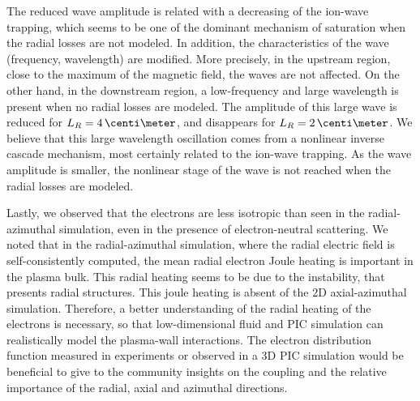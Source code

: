 The reduced wave amplitude is related with a decreasing of the ion-wave trapping, which seems to be one of the dominant mechanism of saturation when the radial losses are not modeled.
In addition, the characteristics of the wave (frequency, wavelength) are modified.
More precisely, in the upstream region, close to the maximum of the magnetic field, the waves are not affected.
On the other hand,  in the downstream region, a low-frequency and large wavelength is present when no radial losses are modeled.
The amplitude of this large wave is reduced for $L_R=4\,\centi\meter$, and disappears for $L_R=2\,\centi\meter$.
We believe that this large wavelength oscillation comes from a nonlinear inverse cascade mechanism, most certainly related to the ion-wave trapping.
As the wave amplitude is smaller, the nonlinear stage of the wave is not reached when the radial losses are modeled.


\vspace{1em}
Lastly, we observed that the electrons are less isotropic than seen in the radial-azimuthal simulation, even in the presence of electron-neutral scattering.
We noted that in the radial-azimuthal simulation, where the radial electric field is self-consistently computed, the mean radial electron Joule heating is important in the plasma bulk.
This radial heating seems to be due to the instability, that presents radial structures.
This joule heating is absent of the \ac{2D} axial-azimuthal simulation.
Therefore, a better understanding of the radial heating of the electrons is necessary, so that low-dimensional fluid and \ac{PIC} simulation can realistically model the plasma-wall interactions.
The electron distribution function measured in experiments or observed in a \ac{3D} \ac{PIC} simulation would be beneficial to give to the community insights on the coupling and the relative importance of the radial, axial and azimuthal directions.

